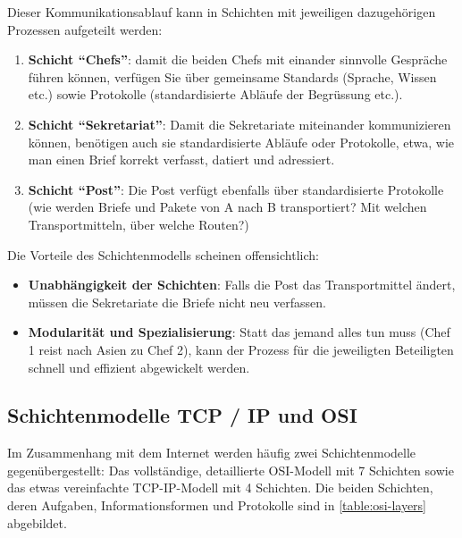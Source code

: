 Dieser Kommunikationsablauf kann in Schichten mit jeweiligen dazugehörigen Prozessen aufgeteilt werden:
\begin{enumerate}
	\item \textbf{Schicht \enquote{Chefs}}: damit die beiden Chefs mit einander sinnvolle Gespräche führen können, verfügen Sie über gemeinsame Standards (Sprache, Wissen etc.) sowie Protokolle (standardisierte Abläufe der Begrüssung etc.).
	\item \textbf{Schicht \enquote{Sekretariat}}: Damit die Sekretariate miteinander kommunizieren können, benötigen auch sie standardisierte Abläufe oder Protokolle, etwa, wie man einen Brief korrekt verfasst, datiert und adressiert.
	\item \textbf{Schicht \enquote{Post}}: Die Post verfügt ebenfalls über standardisierte Protokolle (wie werden Briefe und Pakete von A nach B transportiert? Mit welchen Transportmitteln, über welche Routen?)
\end{enumerate}
Die Vorteile des Schichtenmodells scheinen offensichtlich:
\begin{itemize}
	\item \textbf{Unabhängigkeit der Schichten}: Falls die Post das Transportmittel ändert, müssen die Sekretariate die Briefe nicht neu verfassen.
	\item \textbf{Modularität und Spezialisierung}: Statt das jemand alles tun muss (Chef 1 reist nach Asien zu Chef 2), kann der Prozess für die jeweiligten Beteiligten schnell und effizient abgewickelt werden.
\end{itemize}

\subsection{\texorpdfstring{Schichtenmodelle \acrshort{TCP} / \acrshort{IP} und \acrshort{OSI}}{TCP / IP und OSI}}

Im Zusammenhang mit dem Internet werden häufig zwei Schichtenmodelle gegenübergestellt: Das vollständige, detaillierte \acrfull{OSI}-Modell mit 7 Schichten sowie das etwas vereinfachte \acrfull{TCP}-\acrfull{IP}-Modell mit 4 Schichten. Die beiden Schichten, deren Aufgaben, Informationsformen und Protokolle sind in \cref{table:osi-layers} abgebildet.


\begin{table}[H]
	\centering
	\footnotesize
	
	\label{table:osi-layers}
	\caption{Internet-Schichten-Modelle \gls{OSI} und \gls{TCP}-\gls{IP} sowie deren wichtigste Aufgaben, Informationsformen, Geräte und Protokolle}
\end{table}

